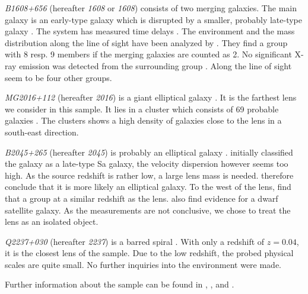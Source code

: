 \documentclass[useAMS,usenatbib]{mn2e}
\begin{document}
\textit{B1608+656} (hereafter \textit{1608} or \textit{1608}) consists of two merging galaxies. The main galaxy is an early-type galaxy which is disrupted by a smaller, probably late-type galaxy \citep{2003ApJ...584..100S}. The system has measured time delays \citep{2002ApJ...581..823F}. The environment and the mass distribution along the line of sight have been analyzed by \cite{2006ApJ...642...30F}. They find a group with 8 resp. 9 members if the merging galaxies are counted as 2. No significant X-ray emission was detected from the surrounding group \citep{2005ApJ...625..633D}. Along the line of sight seem to be four other groups.

\textit{MG2016+112} (hereafter \textit{2016}) is a giant elliptical galaxy \citep{1984Sci...223...46L,1986AJ.....91..991S}. It is the farthest lens we consider in this sample. It lies in a cluster which consists of 69 probable galaxies \citep{2003MNRAS.344..337T}. The clusters shows a high density of galaxies close to the lens in a south-east direction.

\textit{B2045+265} (hereafter \textit{2045}) is probably an elliptical galaxy \citep{2007MNRAS.378..109M}. \cite{1999AJ....117..658F} initially classified the galaxy as a late-type Sa galaxy, the velocity dispersion however seems too high. As the source redshift is rather low, a large lens mass is needed. \cite{2007MNRAS.378..109M} therefore conclude that it is more likely an elliptical galaxy. To the west of the lens, \cite{1999AJ....117..658F} find that a group at a similar redshift as the lens. \cite{2007MNRAS.378..109M} also find evidence for a dwarf satellite galaxy. As the measurements are not conclusive, we chose to treat the lens as an isolated object.

\textit{Q2237+030} (hereafter \textit{2237}) is a barred spiral \citep{1988AJ.....95.1331Y}. With only a redshift of $z=0.04$, it is the closest lens of the sample. Due to the low redshift, the probed physical scales are quite small. No further inquiries into the environment were made.

Further information about the sample can be found in \cite{leier11phd}, \cite{2011ApJ...740...97L}, and \cite{2012A&A...538A..99S}.
\end{document}
